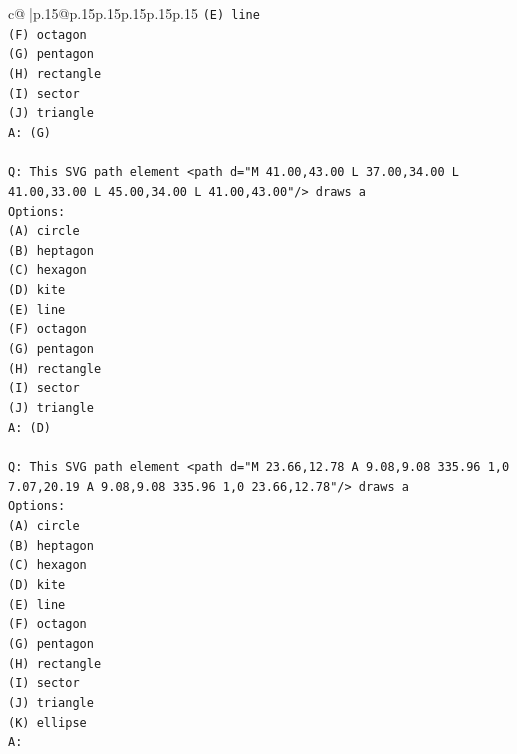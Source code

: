 \documentclass{article}
\begin{document}
{\begin{supertabular}{c@{$\;$}|p{.15\linewidth}@{}p{.15\linewidth}p{.15\linewidth}p{.15\linewidth}p{.15\linewidth}p{.15\linewidth}}
{{{\texttt{(E) line} \\
\texttt{(F) octagon} \\
\texttt{(G) pentagon} \\
\texttt{(H) rectangle} \\
\texttt{(I) sector} \\
\texttt{(J) triangle} \\
\texttt{A: (G)} \\
\\ 
\texttt{Q: This SVG path element <path d="M 41.00,43.00 L 37.00,34.00 L 41.00,33.00 L 45.00,34.00 L 41.00,43.00"/> draws a} \\
\texttt{Options:} \\
\texttt{(A) circle} \\
\texttt{(B) heptagon} \\
\texttt{(C) hexagon} \\
\texttt{(D) kite} \\
\texttt{(E) line} \\
\texttt{(F) octagon} \\
\texttt{(G) pentagon} \\
\texttt{(H) rectangle} \\
\texttt{(I) sector} \\
\texttt{(J) triangle} \\
\texttt{A: (D)} \\
\\ 
\texttt{Q: This SVG path element <path d="M 23.66,12.78 A 9.08,9.08 335.96 1,0 7.07,20.19 A 9.08,9.08 335.96 1,0 23.66,12.78"/> draws a} \\
\texttt{Options:} \\
\texttt{(A) circle} \\
\texttt{(B) heptagon} \\
\texttt{(C) hexagon} \\
\texttt{(D) kite} \\
\texttt{(E) line} \\
\texttt{(F) octagon} \\
\texttt{(G) pentagon} \\
\texttt{(H) rectangle} \\
\texttt{(I) sector} \\
\texttt{(J) triangle} \\
\texttt{(K) ellipse} \\
\texttt{A:} \\
            }
        }
    }
     \\ \\


\end{supertabular}}
\end{document}
